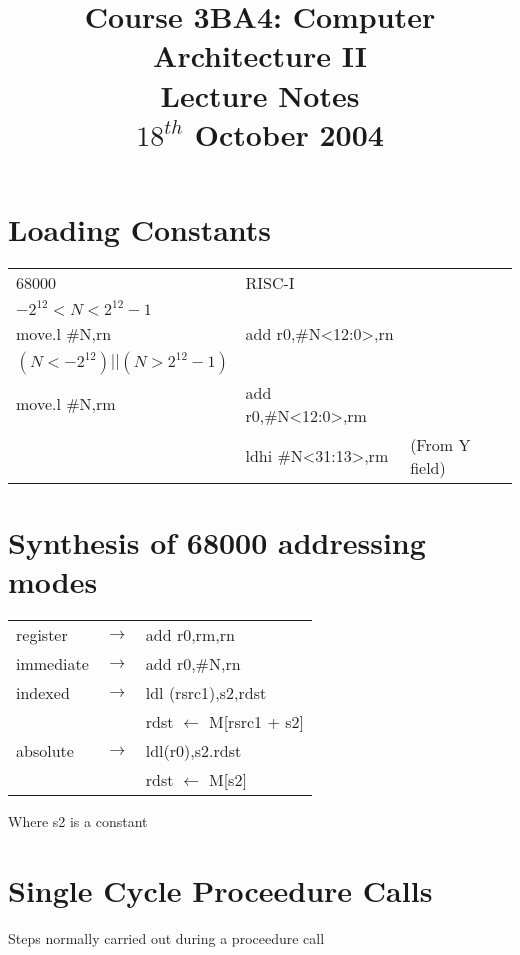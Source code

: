 \documentclass[a4paper,12pt]{article}
\begin{document}
\title{Course 3BA4: Computer Architecture II \\ Lecture Notes \\ $18^{th}$ October 2004}

\maketitle

\section*{Loading Constants}

\begin{tabular}{l l l}
68000 					&	RISC-I 					&							\\
$- 2^{12} < N < 2^{12} - 1$	&					&							\\
move.l \#N,rn			&	add r0,\#N<12:0>,rn	&							\\
$(N < -2^{12}) || (N > 2^{12} -1)$	&			&							\\
move.l \#N,rm			&	add r0,\#N<12:0>,rm	&							\\
							&	ldhi \#N<31:13>,rm		&	(From Y field)		\\						
\end{tabular}

\section*{Synthesis of 68000 addressing modes}

\begin{tabular}{l l l}
register  & $\to$ & add r0,rm,rn \\
immediate & $\to$ & add r0,\#N,rn \\
indexed   & $\to$ & ldl (rsrc1),s2,rdst \\
			 &			& rdst $\leftarrow$ M[rsrc1 + s2] \\
absolute	 &	$\to$	& ldl(r0),s2.rdst \\
			 &			& rdst $\leftarrow$ M[s2] \\
\end{tabular}

Where s2 is a constant

\section*{Single Cycle Proceedure Calls}

Steps normally carried out during a proceedure call
\end{document}
